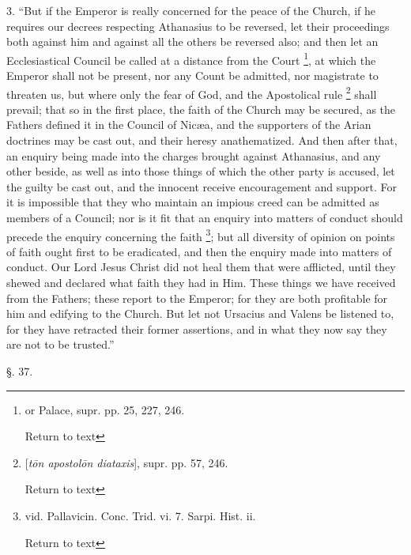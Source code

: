 3. ``But if the Emperor is really concerned for
the peace of the Church, if he requires our decrees respecting
Athanasius to be reversed, let their proceedings both against him and
against all the others be reversed also; and then let an
Ecclesiastical Council be called at a distance from the Court \footnote{or Palace, supr. pp. 25, 227, 246.

Return to text}, at which the Emperor shall not be present, nor any Count be
admitted, nor magistrate to threaten us, but where only the fear of
God, and the Apostolical rule \footnote{[\emph{t\={o}n apostol\={o}n diataxis}], supr. pp. 57, 246.

Return to text} shall
prevail; that so in the first place, the faith of the Church may be
secured, as the Fathers defined it in the Council of Nicæa, and the
supporters of the Arian doctrines may be cast out, and their heresy
anathematized. And then after that, an enquiry being made into the
charges brought against Athanasius, and any other beside, as well as
into those things of which the other party is accused, let the guilty
be cast out, and the innocent receive encouragement and support.
For it is impossible that they who maintain an impious creed can be
admitted as members of a Council; nor is it fit that an enquiry into
matters of conduct should precede the enquiry concerning the faith \footnote{vid. Pallavicin. Conc. Trid. vi. 7. Sarpi. Hist. ii.

Return to text}; but all diversity of opinion on points of faith ought first to be
eradicated, and then the enquiry made into matters of conduct. Our
Lord Jesus Christ did not heal them that were afflicted, until they
shewed and declared what faith they had in Him. These things we have
received from the Fathers; these report to the Emperor; for they are
both profitable for him and edifying to the Church. But let not
Ursacius and Valens be listened to, for they have retracted their
former assertions, and in what they now say they are not to be
trusted.''

§. 37.

